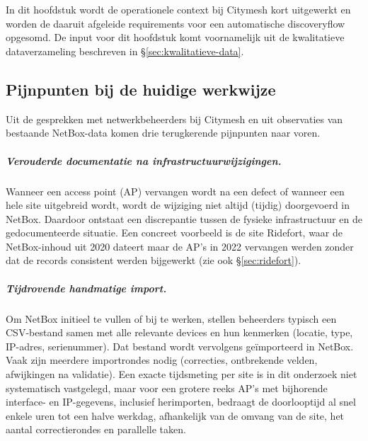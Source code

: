 
\chapter{}%
\label{ch:context}

In dit hoofdstuk wordt de operationele context bij Citymesh kort uitgewerkt en worden de daaruit afgeleide requirements voor een automatische discoveryflow opgesomd. De input voor dit hoofdstuk komt voornamelijk uit de kwalitatieve dataverzameling beschreven in \S\ref{sec:kwalitatieve-data}.

\section{Pijnpunten bij de huidige werkwijze}

Uit de gesprekken met netwerkbeheerders bij Citymesh en uit observaties van bestaande NetBox-data komen drie terugkerende pijnpunten naar voren.

\paragraph{Verouderde documentatie na infrastructuurwijzigingen.} Wanneer een access point (AP) vervangen wordt na een defect of wanneer een hele site uitgebreid wordt, wordt de wijziging niet altijd (tijdig) doorgevoerd in NetBox. Daardoor ontstaat een discrepantie tussen de fysieke infrastructuur en de gedocumenteerde situatie. Een concreet voorbeeld is de site Ridefort, waar de NetBox-inhoud uit 2020 dateert maar de AP's in 2022 vervangen werden zonder dat de records consistent werden bijgewerkt (zie ook \S\ref{sec:ridefort}).

\paragraph{Tijdrovende handmatige import.} Om NetBox initieel te vullen of bij te werken, stellen beheerders typisch een CSV-bestand samen met alle relevante devices en hun kenmerken (locatie, type, IP-adres, serienummer). Dat bestand wordt vervolgens geïmporteerd in NetBox. Vaak zijn meerdere importrondes nodig (correcties, ontbrekende velden, afwijkingen na validatie). Een exacte tijdsmeting per site is in dit onderzoek niet systematisch vastgelegd, maar voor een grotere reeks AP's met bijhorende interface- en IP-gegevens, inclusief herimporten, bedraagt de doorlooptijd al snel enkele uren tot een halve werkdag, afhankelijk van de omvang van de site, het aantal correctierondes en parallelle taken.

